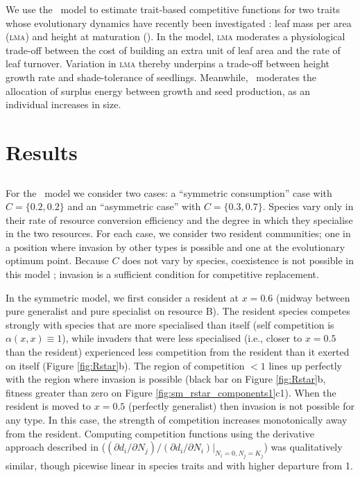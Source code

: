 \documentclass[a4paper,11pt]{article}
\begin{document}
We use the \plant\ model to estimate trait-based competitive functions
for two traits whose evolutionary dynamics have recently been
investigated \citep{Falster-2015}: leaf mass per area (\textsc{lma})
and height at maturation (\hmat). In the model, \textsc{lma} moderates
a physiological trade-off between the cost of building an extra unit
of leaf area and the rate of leaf turnover.  Variation in \textsc{lma}
thereby underpins a trade-off between height growth rate and
shade-tolerance of seedlings. Meanwhile, \hmat\ moderates the
allocation of surplus energy between growth and seed production, as an
individual increases in size.


\section{Results}

%

\subsection{\Rstar}

For the \Rstar\ model we consider two cases: a ``symmetric
consumption'' case with $C = \{0.2, 0.2\}$ and an ``asymmetric case''
with $C = \{0.3, 0.7\}$.  Species vary only in their rate of resource
conversion efficiency and the degree in which they specialise in the
two resources.  For each case, we consider two resident communities;
one in a position where invasion by other types is possible and one at
the evolutionary optimum point.
%
Because $C$ does not vary by species, coexistence is not possible in
this model \citep{Tilman-1982}; invasion is a sufficient condition for
competitive replacement.

In the symmetric model, we first consider a resident at $x = 0.6$
(midway between pure generalist and pure specialist on resource B).
%
The resident species competes strongly with species that are more
specialised than itself (self competition is $\alpha(x, x) \equiv
1$), while invaders that were less specialised (i.e., closer to $x =
0.5$ than the resident) experienced less competition from the resident
than it exerted on itself (Figure \ref{fig:Rstar}b).
%
The region of competition $< 1$ lines up perfectly with the region
where invasion is possible (black bar on Figure \ref{fig:Rstar}b,
fitness greater than zero on Figure
\ref{fig:sm_rstar_components1}c1).
%
When the resident is moved to $x = 0.5$ (perfectly generalist) then
invasion is not possible for any type.  In this case, the strength of
competition increases monotonically away from the resident.
%
Computing competition functions using the derivative approach
described in \citet{Abrams-2008}
($(\partial d_i / \partial N_j) / (\partial d_i / \partial N_i) |_{N_i
  = 0, N_j = K_j}$)
was qualitatively similar, though picewise linear in species traits
and with higher departure from 1.
\end{document}
